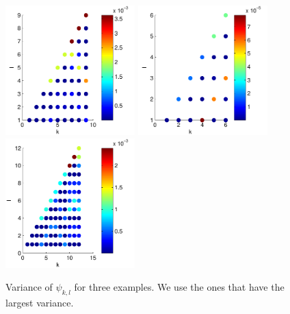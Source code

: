 \documentclass[12pt]{article}
\begin{document}
\begin{figure}[H]
\includegraphics[width=5cm]{data1_coord_var}
\includegraphics[width=5cm]{data2_coord_var}
\includegraphics[width=5cm]{data3_coord_var}
\caption{Variance of $\psi_{k,l}$ for three examples. We use the ones that have the largest variance.}
\end{figure}


\end{document}
